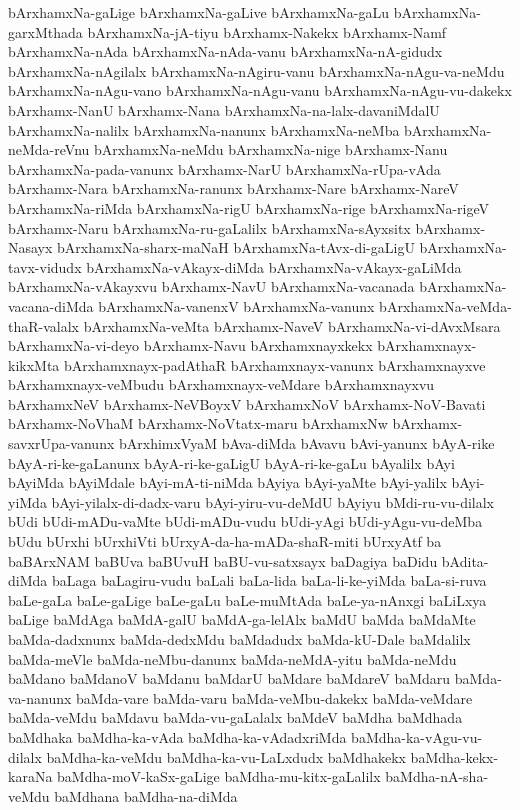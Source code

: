 {bArxhamxNa-gaLige
bArxhamxNa-gaLive
bArxhamxNa-gaLu
bArxhamxNa-garxMthada
bArxhamxNa-jA-tiyu
bArxhamx-Nakekx
bArxhamx-Namf
bArxhamxNa-nAda
bArxhamxNa-nAda-vanu
bArxhamxNa-nA-gidudx
bArxhamxNa-nAgilalx
bArxhamxNa-nAgiru-vanu
bArxhamxNa-nAgu-va-neMdu
bArxhamxNa-nAgu-vano
bArxhamxNa-nAgu-vanu
bArxhamxNa-nAgu-vu-dakekx
bArxhamx-NanU
bArxhamx-Nana
bArxhamxNa-na-lalx-davaniMdalU
bArxhamxNa-nalilx
bArxhamxNa-nanunx
bArxhamxNa-neMba
bArxhamxNa-neMda-reVnu
bArxhamxNa-neMdu
bArxhamxNa-nige
bArxhamx-Nanu
bArxhamxNa-pada-vanunx
bArxhamx-NarU
bArxhamxNa-rUpa-vAda
bArxhamx-Nara
bArxhamxNa-ranunx
bArxhamx-Nare
bArxhamx-NareV
bArxhamxNa-riMda
bArxhamxNa-rigU
bArxhamxNa-rige
bArxhamxNa-rigeV
bArxhamx-Naru
bArxhamxNa-ru-gaLalilx
bArxhamxNa-sAyxsitx
bArxhamx-Nasayx
bArxhamxNa-sharx-maNaH
bArxhamxNa-tAvx-di-gaLigU
bArxhamxNa-tavx-vidudx
bArxhamxNa-vAkayx-diMda
bArxhamxNa-vAkayx-gaLiMda
bArxhamxNa-vAkayxvu
bArxhamx-NavU
bArxhamxNa-vacanada
bArxhamxNa-vacana-diMda
bArxhamxNa-vanenxV
bArxhamxNa-vanunx
bArxhamxNa-veMda-thaR-valalx
bArxhamxNa-veMta
bArxhamx-NaveV
bArxhamxNa-vi-dAvxMsara
bArxhamxNa-vi-deyo
bArxhamx-Navu
bArxhamxnayxkekx
bArxhamxnayx-kikxMta
bArxhamxnayx-padAthaR
bArxhamxnayx-vanunx
bArxhamxnayxve
bArxhamxnayx-veMbudu
bArxhamxnayx-veMdare
bArxhamxnayxvu
bArxhamxNeV
bArxhamx-NeVBoyxV
bArxhamxNoV
bArxhamx-NoV-Bavati
bArxhamx-NoVhaM
bArxhamx-NoVtatx-maru
bArxhamxNw
bArxhamx-savxrUpa-vanunx
bArxhimxVyaM
bAva-diMda
bAvavu
bAvi-yanunx
bAyA-rike
bAyA-ri-ke-gaLanunx
bAyA-ri-ke-gaLigU
bAyA-ri-ke-gaLu
bAyalilx
bAyi
bAyiMda
bAyiMdale
bAyi-mA-ti-niMda
bAyiya
bAyi-yaMte
bAyi-yalilx
bAyi-yiMda
bAyi-yilalx-di-dadx-varu
bAyi-yiru-vu-deMdU
bAyiyu
bMdi-ru-vu-dilalx
bUdi
bUdi-mADu-vaMte
bUdi-mADu-vudu
bUdi-yAgi
bUdi-yAgu-vu-deMba
bUdu
bUrxhi
bUrxhiVti
bUrxyA-da-ha-mADa-shaR-miti
bUrxyAtf
ba
baBArxNAM
baBUva
baBUvuH
baBU-vu-satxsayx
baDagiya
baDidu
bAdita-diMda
baLaga
baLagiru-vudu
baLali
baLa-lida
baLa-li-ke-yiMda
baLa-si-ruva
baLe-gaLa
baLe-gaLige
baLe-gaLu
baLe-muMtAda
baLe-ya-nAnxgi
baLiLxya
baLige
baMdAga
baMdA-galU
baMdA-ga-lelAlx
baMdU
baMda
baMdaMte
baMda-dadxnunx
baMda-dedxMdu
baMdadudx
baMda-kU-Dale
baMdalilx
baMda-meVle
baMda-neMbu-danunx
baMda-neMdA-yitu
baMda-neMdu
baMdano
baMdanoV
baMdanu
baMdarU
baMdare
baMdareV
baMdaru
baMda-va-nanunx
baMda-vare
baMda-varu
baMda-veMbu-dakekx
baMda-veMdare
baMda-veMdu
baMdavu
baMda-vu-gaLalalx
baMdeV
baMdha
baMdhada
baMdhaka
baMdha-ka-vAda
baMdha-ka-vAdadxriMda
baMdha-ka-vAgu-vu-dilalx
baMdha-ka-veMdu
baMdha-ka-vu-LaLxdudx
baMdhakekx
baMdha-kekx-karaNa
baMdha-moV-kaSx-gaLige
baMdha-mu-kitx-gaLalilx
baMdha-nA-sha-veMdu
baMdhana
baMdha-na-diMda
}
